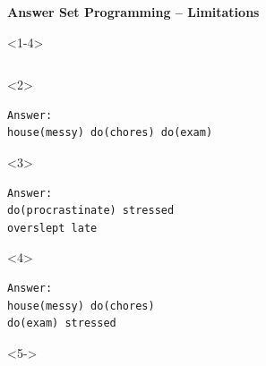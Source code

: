 \documentclass[aspectratio=169]{beamer}
\begin{document}
\begin{frame}[fragile]{\textbf{Answer Set Programming -- Limitations}}
\begin{onlyenv}<1-4>
  \begin{minipage}{0.6\textwidth}
    \inputminted[fontsize=\footnotesize]{pasp}{code/exam.plp}
  \end{minipage}%
  \begin{minipage}{0.4\textwidth}
    \footnotesize

    \vspace{1cm}

    \begin{onlyenv}<2>
      \begin{verbatim}
Answer:
house(messy) do(chores) do(exam)
      \end{verbatim}
    \end{onlyenv}
    \begin{onlyenv}<3>
      \begin{verbatim}
Answer:
do(procrastinate) stressed
overslept late
      \end{verbatim}
    \end{onlyenv}
    \begin{onlyenv}<4>
      \begin{verbatim}
Answer:
house(messy) do(chores)
do(exam) stressed
      \end{verbatim}
    \end{onlyenv}
  \end{minipage}
\end{onlyenv}
\begin{onlyenv}<5->
  \footnotesize
\end{onlyenv}
\end{frame}
\end{document}
